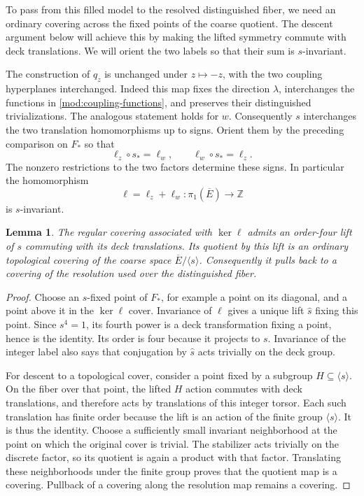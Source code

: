 \documentclass[11pt,reqno]{amsart}
\numberwithin{equation}{section}
\newtheorem{lemma}[theorem]{Lemma}
\theoremstyle{definition}
\theoremstyle{remark}
\begin{document}
To pass from this filled model to the resolved distinguished fiber,
we need an ordinary covering across the fixed points of the coarse
quotient.  The descent argument below will achieve this by making the
lifted symmetry commute with deck translations.  We will orient the
two labels so that their sum is $s$-invariant.

The construction of $q_z$ is unchanged under $z\mapsto-z$, with
the two coupling hyperplanes interchanged.  Indeed this map fixes
the direction $\lambda$, interchanges the functions in
\eqref{mod:coupling-functions}, and preserves their distinguished
trivializations.  The analogous statement holds for $w$.
Consequently $s$ interchanges the two translation homomorphisms up
to signs.  Orient them by the preceding comparison on $F_*$ so that
\[
 \ell_z\circ s_* =\ell_w,
 \qquad \ell_w\circ s_* =\ell_z.
\]
The nonzero restrictions to the two factors determine these signs.
In particular the homomorphism
\begin{equation}\label{mod:sum-label}
 \ell=\ell_z+\ell_w:\pi_1(\overline E)\longrightarrow\mathbb Z
\end{equation}
is $s$-invariant.

\begin{lemma}\label{mod:central}
The regular covering associated with $\ker\ell$ admits an order-four
lift of $s$ commuting with its deck translations.  Its quotient by
this lift is an ordinary topological covering of the coarse space
$\overline E/\langle s\rangle$.  Consequently it pulls back to a
covering of the resolution used over the distinguished fiber.
\end{lemma}
\begin{proof}
Choose an $s$-fixed point of $F_*$, for example a point on its
diagonal, and a point above it in the $\ker\ell$ cover.  Invariance
of $\ell$ gives a unique lift $\widehat s$ fixing this point.  Since
$s^4=1$, its fourth power is a deck transformation fixing a point,
hence is the identity.  Its order is four because it projects to
$s$.  Invariance of the integer label also says that conjugation
by $\widehat s$ acts trivially on the deck group.

For descent to a topological cover, consider a point fixed by a
subgroup $H\subseteq\langle s\rangle$.  On the fiber over that
point, the lifted $H$ action commutes with deck translations, and
therefore acts by translations of this integer torsor.  Each such
translation has finite order because the lift is an action of the
finite group $\langle s\rangle$.  It is thus the identity.  Choose
a sufficiently small invariant neighborhood at the point on which
the original cover is trivial.  The stabilizer acts trivially on
the discrete factor, so its quotient is again a product with that
factor.  Translating these neighborhoods under the finite group
proves that the quotient map is a covering.  Pullback of a covering
along the resolution map remains a covering.
\end{proof}
\end{document}
